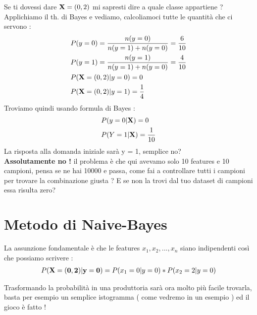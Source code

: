 \documentclass[a4paper, 12pt, twoside]{report}
\begin{document}
Se ti dovessi dare $\vb{X}=\qty(0,2)$ mi sapresti dire a quale classe appartiene ? \\
Applichiamo il th. di Bayes e vediamo, calcoliamoci tutte le quantità che ci servono : 
\begin{align*}
        &P(y=0) = \frac{n(y=0)}{n(y=1) + n(y=0)} = \frac{6}{10}\\
        &P(y=1) = \frac{n(y=1)}{n(y=1) + n(y=0)} = \frac{4}{10} \\
        &P(\vb{X}=(0,2)|y=0) = 0 \\
        &P(\vb{X}=(0,2)|y=1) = \frac{1}{4}
\end{align*}
Troviamo quindi usando formula di Bayes : 
\begin{align*}
        &P(y = 0|\vb{X}) = 0 \\
        &P(Y=1 |\vb{X}) = \frac{1}{10}
\end{align*}
La risposta alla domanda iniziale sarà y = 1, semplice no? \\ 
\textbf{Assolutamente no !} il problema 
è che qui avevamo solo 10 features e 10 campioni, pensa se ne hai 10000 e passa, come fai a controllare 
tutti i campioni per trovare la combinazione giusta ? E se non la trovi dal tuo dataset di campioni essa risulta zero? 
\section{Metodo di Naive-Bayes}
\begin{tcolorbox}[colback=red!5!white,colframe=red!50!black,title=ATTENZIONE !]
La assunzione fondamentale è che le features $x_1 , x_2, ... , x_n$ siano indipendenti così che possiamo scrivere : 
\begin{align*}
    P(\vb{X=(0,2)|y=0}) = P(x_1=0|y=0)*P(x_2=2|y=0)
\end{align*}
\end{tcolorbox}
Trasformando la probabilità in una produttoria sarà ora molto più facile trovarla, basta per esempio un semplice istogramma 
( come vedremo in un esempio ) ed il gioco è fatto !
\end{document}
